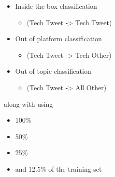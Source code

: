 \documentclass[17pt]{beamer}
\begin{document}
\begin{frame}%
	
	\begin{itemize}
		\item Inside the box classification 
		\begin{itemize}
			\item (Tech Tweet -> Tech Tweet)
		\end{itemize}
        \item Out of platform classification
        \begin{itemize}
        	\item (Tech Tweet -> Tech Other)
        \end{itemize}
        \item Out of topic classification
      	\begin{itemize}
        	\item (Tech Tweet -> All Other)
        \end{itemize}
        
	\end{itemize}
along with using
\begin{itemize}
	\item 100\% 
	\item 50\%
	\item 25\%
	\item and 12.5\% of the training set
\end{itemize}
\end{frame}
\end{document}
